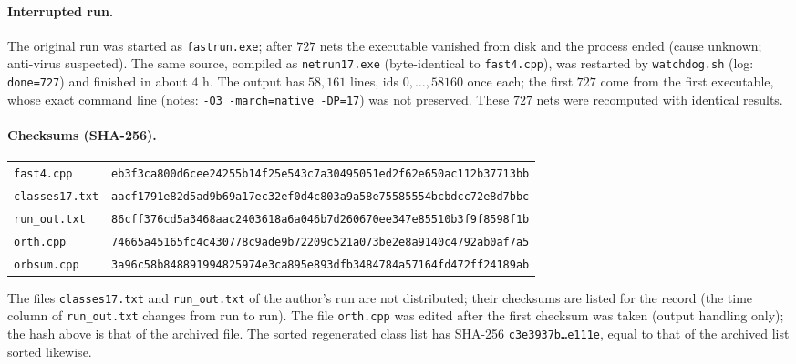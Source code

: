 \documentclass[11pt,a4paper]{article}
\theoremstyle{definition}
\begin{document}
\paragraph{Interrupted run.} The original run was started as \texttt{fastrun.exe}; after $727$ nets the executable vanished from disk and the process ended (cause unknown; anti-virus suspected). The same source, compiled as \texttt{netrun17.exe} (byte-identical to \texttt{fast4.cpp}), was restarted by \texttt{watchdog.sh} (log: \texttt{done=727}) and finished in about $4$ h. The output has $58{,}161$ lines, ids $0,\dots,58160$ once each; the first $727$ come from the first executable, whose exact command line (notes: \texttt{-O3 -march=native -DP=17}) was not preserved. These $727$ nets were recomputed with identical results.

\paragraph{Checksums (SHA-256).}
{\tiny\setlength{\tabcolsep}{3pt}\begin{tabular}{ll}
\texttt{fast4.cpp} & \texttt{eb3f3ca800d6cee24255b14f25e543c7a30495051ed2f62e650ac112b37713bb}\\
\texttt{classes17.txt} & \texttt{aacf1791e82d5ad9b69a17ec32ef0d4c803a9a58e75585554bcbdcc72e8d7bbc}\\
\texttt{run\_out.txt} & \texttt{86cff376cd5a3468aac2403618a6a046b7d260670ee347e85510b3f9f8598f1b}\\
\texttt{orth.cpp} & \texttt{74665a45165fc4c430778c9ade9b72209c521a073be2e8a9140c4792ab0af7a5}\\
\texttt{orbsum.cpp} & \texttt{3a96c58b848891994825974e3ca895e893dfb3484784a57164fd472ff24189ab}
\end{tabular}}
The files \texttt{classes17.txt} and \texttt{run\_out.txt} of the author's run are not distributed; their checksums are listed for the record (the time column of \texttt{run\_out.txt} changes from run to run). The file \texttt{orth.cpp} was edited after the first checksum was taken (output handling only); the hash above is that of the archived file. The sorted regenerated class list has SHA-256 \texttt{c3e3937b\dots e111e}, equal to that of the archived list sorted likewise.

{\footnotesize

}
\end{document}

